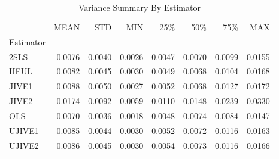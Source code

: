 \begin{table}[ht]
\centering
\caption{Variance Summary By Estimator}
\begin{tabular}{lrrrrrrr}
\toprule
 & MEAN & STD & MIN & 25\% & 50\% & 75\% & MAX \\
Estimator &  &  &  &  &  &  &  \\
\midrule
2SLS & 0.0076 & 0.0040 & 0.0026 & 0.0047 & 0.0070 & 0.0099 & 0.0155 \\
HFUL & 0.0082 & 0.0045 & 0.0030 & 0.0049 & 0.0068 & 0.0104 & 0.0168 \\
JIVE1 & 0.0088 & 0.0050 & 0.0027 & 0.0052 & 0.0068 & 0.0127 & 0.0172 \\
JIVE2 & 0.0174 & 0.0092 & 0.0059 & 0.0110 & 0.0148 & 0.0239 & 0.0330 \\
OLS & 0.0070 & 0.0036 & 0.0018 & 0.0048 & 0.0074 & 0.0084 & 0.0147 \\
UJIVE1 & 0.0085 & 0.0044 & 0.0030 & 0.0052 & 0.0072 & 0.0116 & 0.0163 \\
UJIVE2 & 0.0086 & 0.0045 & 0.0030 & 0.0054 & 0.0073 & 0.0116 & 0.0166 \\
\bottomrule
\end{tabular}
\end{table}
